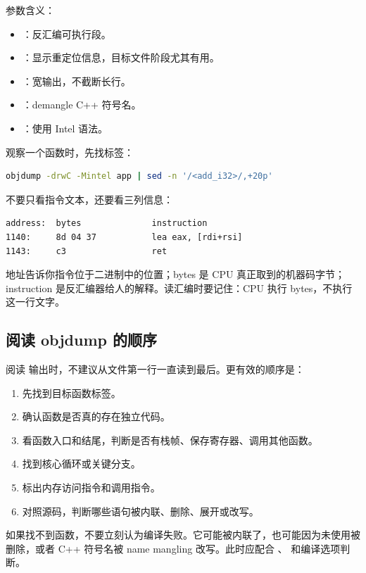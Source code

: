 参数含义：

\begin{itemize}
  \item {}：反汇编可执行段。
  \item {}：显示重定位信息，目标文件阶段尤其有用。
  \item {}：宽输出，不截断长行。
  \item {}：demangle C++ 符号名。
  \item {}：使用 Intel 语法。
\end{itemize}

观察一个函数时，先找标签：

\begin{lstlisting}[language=bash]
objdump -drwC -Mintel app | sed -n '/<add_i32>/,+20p'
\end{lstlisting}

不要只看指令文本，还要看三列信息：

\begin{lstlisting}
address:  bytes              instruction
1140:     8d 04 37           lea eax, [rdi+rsi]
1143:     c3                 ret
\end{lstlisting}

地址告诉你指令位于二进制中的位置；bytes 是 CPU 真正取到的机器码字节；instruction 是反汇编器给人的解释。读汇编时要记住：CPU 执行 bytes，不执行这一行文字。

\subsection{阅读 objdump 的顺序}

阅读  输出时，不建议从文件第一行一直读到最后。更有效的顺序是：

\begin{enumerate}
  \item 先找到目标函数标签。
  \item 确认函数是否真的存在独立代码。
  \item 看函数入口和结尾，判断是否有栈帧、保存寄存器、调用其他函数。
  \item 找到核心循环或关键分支。
  \item 标出内存访问指令和调用指令。
  \item 对照源码，判断哪些语句被内联、删除、展开或改写。
\end{enumerate}

如果找不到函数，不要立刻认为编译失败。它可能被内联了，也可能因为未使用被删除，或者 C++ 符号名被 name mangling 改写。此时应配合 、 和编译选项判断。

